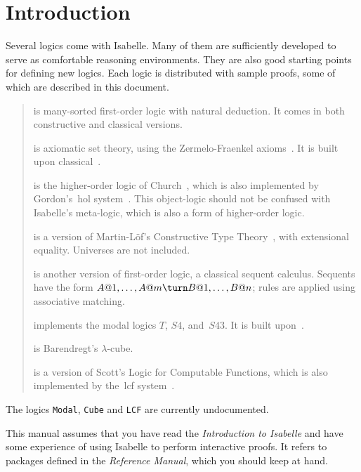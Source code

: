 \chapter{Introduction}
Several logics come with Isabelle.  Many of them are sufficiently developed
to serve as comfortable reasoning environments.  They are also good
starting points for defining new logics.  Each logic is distributed with
sample proofs, some of which are described in this document.

\begin{quote}
{} is many-sorted first-order logic with natural
deduction.  It comes in both constructive and classical versions.

{} is axiomatic set theory, using the Zermelo-Fraenkel
axioms~\cite{suppes72}.  It is built upon classical~\FOL{}.
 
{} is the higher-order logic of Church~\cite{church40},
which is also implemented by Gordon's~{\sc hol} system~\cite{mgordon88a}.  This
object-logic should not be confused with Isabelle's meta-logic, which is
also a form of higher-order logic.
 
{} is a version of Martin-L\"of's Constructive Type
Theory~\cite{nordstrom90}, with extensional equality.  Universes are not
included.
 
{} is another version of first-order logic, a classical
sequent calculus.  Sequents have the form $A@1,\ldots,A@m\turn
B@1,\ldots,B@n$; rules are applied using associative matching.

{} implements the modal logics $T$, $S4$, and~$S43$.  It
is built upon~\LK{}.

{} is Barendregt's $\lambda$-cube.

{} is a version of Scott's Logic for Computable Functions,
which is also implemented by the~{\sc lcf} system~\cite{paulson87}.
\end{quote}
The logics {\tt Modal}, {\tt Cube} and {\tt LCF} are currently undocumented.

This manual assumes that you have read the {\em Introduction to Isabelle\/}
and have some experience of using Isabelle to perform interactive proofs.
It refers to packages defined in the {\em Reference Manual}, which you
should keep at hand.


